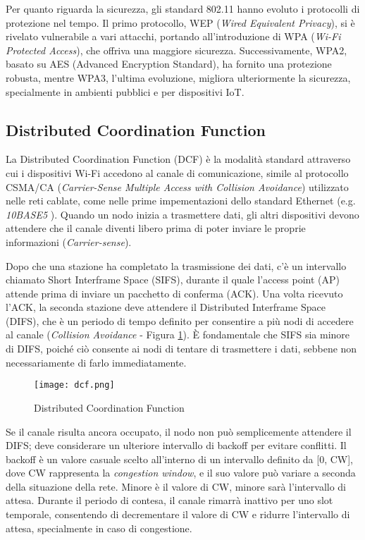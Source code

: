 Per quanto riguarda la sicurezza, gli standard 802.11 hanno evoluto i protocolli di protezione nel tempo. Il primo protocollo, WEP (\textit{Wired Equivalent Privacy}), si è rivelato vulnerabile a vari attacchi, portando all'introduzione di WPA (\textit{Wi-Fi Protected Access}), che offriva una maggiore sicurezza. Successivamente, WPA2, basato su AES (Advanced Encryption Standard), ha fornito una protezione robusta, mentre WPA3, l'ultima evoluzione, migliora ulteriormente la sicurezza, specialmente in ambienti pubblici e per dispositivi IoT.

\subsection[DCF]{Distributed Coordination Function}
La Distributed Coordination Function (DCF) è la modalità standard attraverso cui i dispositivi Wi-Fi accedono al canale di comunicazione, simile al protocollo CSMA/CA (\textit{Carrier-Sense Multiple Access with Collision Avoidance}) utilizzato nelle reti cablate, come nelle prime impementazioni dello standard Ethernet (e.g. \textit{10BASE5} \cite{9844436}). Quando un nodo inizia a trasmettere dati, gli altri dispositivi devono attendere che il canale diventi libero prima di poter inviare le proprie informazioni (\textit{Carrier-sense}).

Dopo che una stazione ha completato la trasmissione dei dati, c'è un intervallo chiamato Short Interframe Space (SIFS), durante il quale l'access point (AP) attende prima di inviare un pacchetto di conferma (ACK). Una volta ricevuto l'ACK, la seconda stazione deve attendere il Distributed Interframe Space (DIFS), che è un periodo di tempo definito per consentire a più nodi di accedere al canale (\textit{Collision Avoidance} - Figura \ref{fig:dcf}). È fondamentale che SIFS sia minore di DIFS, poiché ciò consente ai nodi di tentare di trasmettere i dati, sebbene non necessariamente di farlo immediatamente.

\begin{figure}[h!]
    \centering
    \texttt{[image: dcf.png]}
    \caption{Distributed Coordination Function}
    \label{fig:dcf}
\end{figure}

Se il canale risulta ancora occupato, il nodo non può semplicemente attendere il DIFS; deve considerare un ulteriore intervallo di backoff per evitare conflitti. Il backoff è un valore casuale scelto all'interno di un intervallo definito da [0, CW], dove CW rappresenta la \textit{congestion window}, e il suo valore può variare a seconda della situazione della rete. Minore è il valore di CW, minore sarà l'intervallo di attesa. Durante il periodo di contesa, il canale rimarrà inattivo per uno slot temporale, consentendo di decrementare il valore di CW e ridurre l'intervallo di attesa, specialmente in caso di congestione.

